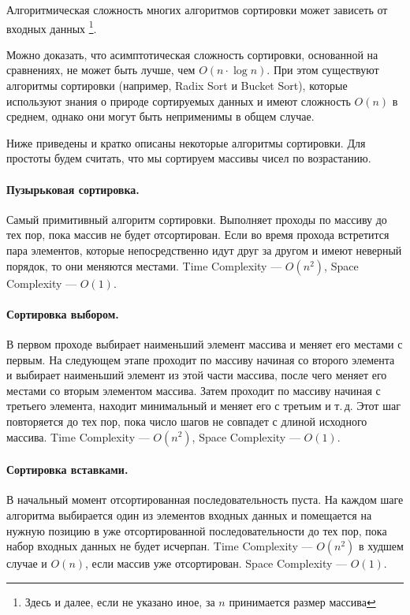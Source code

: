 \documentclass[14pt, a4paper]{extarticle}
\begin{document}
Алгоритмическая сложность многих алгоритмов сортировки может зависеть от входных данных
\footnote{Здесь и далее, если не указано иное, за $n$ принимается размер массива}.

Можно доказать, что асимптотическая сложность сортировки, основанной на сравнениях, не может
быть лучше, чем $O(n\cdot \log n)$. При этом существуют алгоритмы сортировки (например, Radix Sort и Bucket Sort),
которые используют знания о природе сортируемых данных и имеют сложность $O(n)$ в среднем, однако они могут быть
неприменимы в общем случае.

Ниже приведены и кратко описаны некоторые алгоритмы сортировки. Для простоты будем считать,
что мы сортируем массивы чисел по возрастанию.

\paragraph{Пузырьковая сортировка.} Самый примитивный алгоритм сортировки. Выполняет проходы по массиву
до тех пор, пока массив не будет отсортирован. Если во время прохода встретится пара элементов, которые
непосредственно идут друг за другом и имеют неверный порядок, то они меняются местами. Time Complexity --- $O(n^2)$,
Space Complexity --- $O(1)$.

\paragraph{Сортировка выбором.} В первом проходе выбирает наименьший элемент массива и меняет его местами с первым.
На следующем этапе проходит по массиву начиная со второго элемента и выбирает наименьший элемент из этой части массива,
после чего меняет его местами со вторым элементом массива. Затем проходит по массиву начиная с третьего элемента, находит
минимальный и меняет его с третьим и т.\,д. Этот шаг повторяется до тех пор, пока число шагов не совпадет с длиной исходного массива.
Time Complexity --- $O(n^2)$, Space Complexity --- $O(1)$.

\paragraph{Сортировка вставками.} 
В начальный момент отсортированная последовательность пуста. На каждом шаге алгоритма выбирается один из
элементов входных данных и помещается на нужную позицию в уже отсортированной последовательности до тех пор,
пока набор входных данных не будет исчерпан.
Time Complexity --- $O(n^2)$ в худшем случае и $O(n)$, если массив уже отсортирован. Space Complexity --- $O(1)$.
\end{document}
